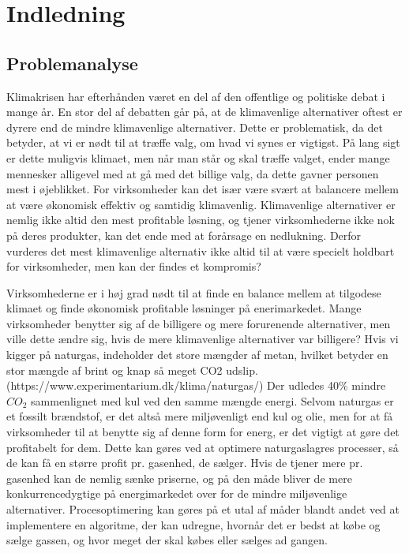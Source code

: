 \chapter{Indledning}
\section{Problemanalyse}
Klimakrisen har efterhånden været en del af den offentlige og politiske debat i mange år. En stor del af debatten går på, at de klimavenlige alternativer oftest er dyrere end de mindre klimavenlige alternativer. Dette er problematisk, da det betyder, at vi er nødt til at træffe valg, om hvad vi synes er vigtigst. På lang sigt er dette muligvis klimaet, men når man står og skal træffe valget, ender mange mennesker alligevel med at gå med det billige valg, da dette gavner personen mest i øjeblikket.
For virksomheder kan det især være svært at balancere mellem at være økonomisk effektiv og samtidig klimavenlig. Klimavenlige alternativer er nemlig ikke altid den mest profitable løsning, og tjener virksomhederne ikke nok på deres produkter, kan det ende med at forårsage en nedlukning. Derfor vurderes det mest klimavenlige alternativ ikke altid til at være specielt holdbart for virksomheder, men kan der findes et kompromis? 

Virksomhederne er i høj grad nødt til at finde en balance mellem at tilgodese klimaet og finde økonomisk profitable løsninger på enerimarkedet. Mange virksomheder benytter sig af de billigere og mere forurenende alternativer, men ville dette ændre sig, hvis de mere klimavenlige alternativer var billigere?
Hvis vi kigger på naturgas, indeholder det store mængder af metan, hvilket betyder en stor mængde af brint og knap så meget CO2 udslip. (https://www.experimentarium.dk/klima/naturgas/) Der udledes 40$\%$ mindre $CO_{2}$ sammenlignet med kul ved den samme mængde energi. Selvom naturgas er et fossilt brændstof, er det altså mere miljøvenligt end kul og olie, men for at få virksomheder til at benytte sig af denne form for energ, er det vigtigt at gøre det profitabelt for dem. Dette kan gøres ved at optimere naturgaslagres processer, så de kan få en større profit pr. gasenhed, de sælger. Hvis de tjener mere pr. gasenhed kan de nemlig sænke priserne, og på den måde bliver de mere konkurrencedygtige på energimarkedet over for de mindre miljøvenlige alternativer.
Procesoptimering kan gøres på et utal af måder blandt andet ved at implementere en algoritme, der kan udregne, hvornår det er bedst at købe og sælge gassen, og hvor meget der skal købes eller sælges ad gangen. 

